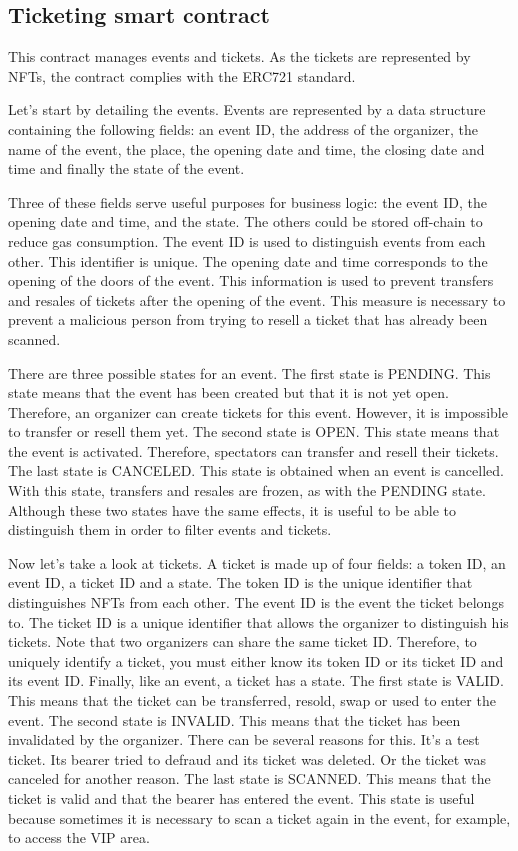 \documentclass[a4paper,11pt,oneside]{report}
\begin{document}
\subsection{Ticketing smart contract}
This contract manages events and tickets. As the tickets are represented by NFTs, the contract complies with the ERC721 standard.

Let's start by detailing the events. Events are represented by a data structure containing the following fields: an event ID, the address of the organizer, the name of the event, the place, the opening date and time, the closing date and time and finally the state of the event. 

Three of these fields serve useful purposes for business logic: the event ID, the opening date and time, and the state. The others could be stored off-chain to reduce gas consumption. The event ID is used to distinguish events from each other. This identifier is unique. The opening date and time corresponds to the opening of the doors of the event. This information is used to prevent transfers and resales of tickets after the opening of the event. This measure is necessary to prevent a malicious person from trying to resell a ticket that has already been scanned.

There are three possible states for an event. The first state is PENDING. This state means that the event has been created but that it is not yet open. Therefore, an organizer can create tickets for this event. However, it is impossible to transfer or resell them yet. The second state is OPEN. This state means that the event is activated. Therefore, spectators can transfer and resell their tickets. The last state is CANCELED. This state is obtained when an event is cancelled. With this state, transfers and resales are frozen, as with the PENDING state. Although these two states have the same effects, it is useful to be able to distinguish them in order to filter events and tickets.

Now let's take a look at tickets. A ticket is made up of four fields: a token ID, an event ID, a ticket ID and a state. The token ID is the unique identifier that distinguishes NFTs from each other. The event ID is the event the ticket belongs to. The ticket ID is a unique identifier that allows the organizer to distinguish his tickets. Note that two organizers can share the same ticket ID. Therefore, to uniquely identify a ticket, you must either know its token ID or its ticket ID and its event ID. Finally, like an event, a ticket has a state. The first state is VALID. This means that the ticket can be transferred, resold, swap or used to enter the event. The second state is INVALID. This means that the ticket has been invalidated by the organizer. There can be several reasons for this. It's a test ticket. Its bearer tried to defraud and its ticket was deleted. Or the ticket was canceled for another reason. The last state is SCANNED. This means that the ticket is valid and that the bearer has entered the event. This state is useful because sometimes it is necessary to scan a ticket again in the event, for example, to access the VIP area.
\end{document}
